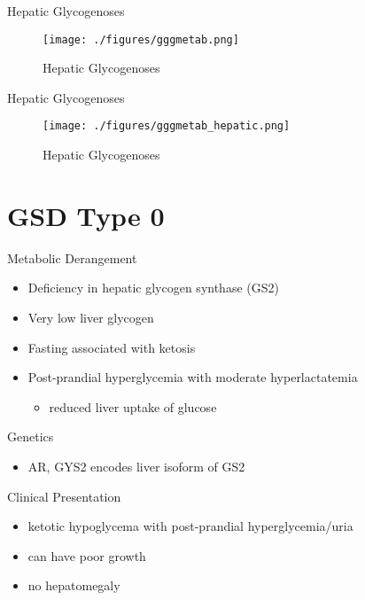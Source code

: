 \documentclass[presentation, smaller]{beamer}
\begin{document}
\begin{frame}[label={sec:org4d2b149}]{Hepatic Glycogenoses}
\begin{figure}[htbp]
\centering
\texttt{[image: ./figures/gggmetab.png]}
\caption[Hepatic Glycogenoses]{\label{fig:org986a17e}
Hepatic Glycogenoses}
\end{figure}
\end{frame}



\begin{frame}[label={sec:orgfae0911}]{Hepatic Glycogenoses}
\begin{figure}[htbp]
\centering
\texttt{[image: ./figures/gggmetab\_hepatic.png]}
\caption[Hepatic Glycogenoses]{\label{fig:orgb768350}
Hepatic Glycogenoses}
\end{figure}
\end{frame}


\section{GSD Type 0}
\label{sec:orgb1a265f}
\begin{frame}[label={sec:orge8f7a38}]{Metabolic Derangement}
\begin{itemize}
\item Deficiency in hepatic glycogen synthase (GS2)
\item Very low liver glycogen
\item Fasting associated with ketosis
\item Post-prandial hyperglycemia with moderate hyperlactatemia
\begin{itemize}
\item reduced liver uptake of glucose
\end{itemize}
\end{itemize}
\end{frame}

\begin{frame}[label={sec:org282c4bb}]{Genetics}
\begin{itemize}
\item AR, GYS2 encodes liver isoform of GS2
\end{itemize}
\end{frame}

\begin{frame}[label={sec:org28c3fff}]{Clinical Presentation}
\begin{itemize}
\item ketotic hypoglycema with post-prandial hyperglycemia/uria
\item can have poor growth
\item no hepatomegaly
\end{itemize}
\end{frame}
\end{document}
